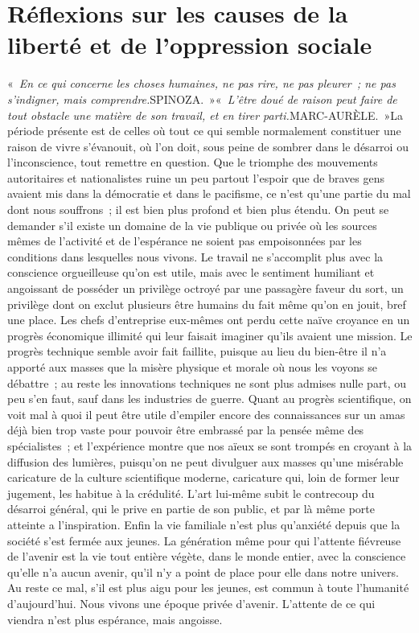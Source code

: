 \documentclass[french,twoside]{book} %
\begin{document}
\section[Réflexions sur les causes de la liberté et de l’oppression sociale]{Réflexions sur les causes de la liberté et de l’oppression sociale}\renewcommand{\leftmark}{Réflexions sur les causes de la liberté et de l’oppression sociale}

« \emph{En ce qui concerne les choses humaines, ne pas rire, ne pas pleurer ; ne pas s'indigner, mais comprendre.}{\citbibl SPINOZA.} »« \emph{L'être doué de raison peut faire de tout obstacle une matière de son travail, et en tirer parti.}{\citbibl MARC-AURÈLE.} »\noindent La période présente est de celles où tout ce qui semble normalement constituer une raison de vivre s'évanouit, où l'on doit, sous peine de sombrer dans le désarroi ou l'inconscience, tout remettre en question. Que le triomphe des mouvements autoritaires et nationalistes ruine un peu partout l'espoir que de braves gens avaient mis dans la démocratie et dans le pacifisme, ce n'est qu'une partie du mal dont nous souffrons ; il est bien plus profond et bien plus étendu. On peut se demander s'il existe un domaine de la vie publique ou privée où les sources mêmes de l'activité et de l'espérance ne soient pas empoisonnées par les conditions dans lesquelles nous vivons. Le travail ne s'accomplit plus avec la conscience orgueilleuse qu'on est utile, mais avec le sentiment humiliant et angoissant de posséder un privilège octroyé par une passagère faveur du sort, un privilège dont on exclut plusieurs être humains du fait même qu'on en jouit, bref une place. Les chefs d'entreprise eux-mêmes ont perdu cette naïve croyance en un progrès économique illimité qui leur faisait imaginer qu'ils avaient une mission. Le progrès technique semble avoir fait faillite, puisque au lieu du bien-être il n'a apporté aux masses que la misère physique et morale où nous les voyons se débattre ; au reste les innovations techniques ne sont plus admises nulle part, ou peu s'en faut, sauf dans les industries de guerre. Quant au progrès scientifique, on voit mal à quoi il peut être utile d'empiler encore des connaissances sur un amas déjà bien trop vaste pour pouvoir être embrassé par la pensée même des spécialistes ; et l'expérience montre que nos aïeux se sont trompés en croyant à la diffusion des lumières, puisqu'on ne peut divulguer aux masses qu'une misérable caricature de la culture scientifique moderne, caricature qui, loin de former leur jugement, les habitue à la crédulité. L'art lui-même subit le contrecoup du désarroi général, qui le prive en partie de son public, et par là même porte atteinte a l'inspiration. Enfin la vie familiale n'est plus qu'anxiété depuis que la société s'est fermée aux jeunes. La génération même pour qui l'attente fiévreuse de l'avenir est la vie tout entière végète, dans le monde entier, avec la conscience qu'elle n'a aucun avenir, qu'il n'y a point de place pour elle dans notre univers. Au reste ce mal, s'il est plus aigu pour les jeunes, est commun à toute l'humanité d'aujourd'hui. Nous vivons une époque privée d'avenir. L'attente de ce qui viendra n'est plus espérance, mais angoisse.\par
\end{document}
